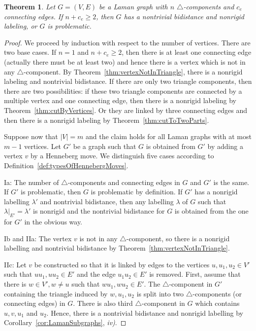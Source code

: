 \documentclass[a4paper, 11pt]{article}
\newcommand{\trcomp}{$\triangle$-component}
\newcommand{\trcomps}{$\triangle$-components}
\newtheorem{thm}{Theorem}[section]
\theoremstyle{definition}
\begin{document}
\begin{thm}
Let $G=(V,E)$ be a Laman graph with $n$ \trcomps{} and $c_e$ connecting edges. If $n+c_e\geq 2$, then $G$ has a nontrivial bidistance and nonrigid labeling, or $G$ is problematic.
\end{thm}
\begin{proof}
We proceed by induction with respect to the number of vertices. There are two base cases. If $n=1$ and $n+c_e\geq 2$, then there is at least one connecting edge (actually there must be at least two) and hence there is a vertex which is not in any \trcomp{}. By Theorem~\ref{thm:vertexNotInTriangle}, there is a nonrigid labeling and nontrivial bidistance.
If there are only two triangle components, then there are two possibilities: if these two triangle components are connected by a multiple vertex and one connecting edge, then there is a nonrigid labeling by Theorem~\ref{thm:cutByVertices}. Or they are linked by three connecting edges and then there is a nonrigid labeling by Theorem~\ref{thm:cutToTwoParts}.

Suppose now that $|V|=m$ and the claim holds for all Laman graphs with at most $m-1$ vertices. Let $G'$ be a graph such that $G$ is obtained from $G'$ by adding a vertex $v$ by a Henneberg move. We distinguish five cases according to Definition~\ref{def:typesOfHennebergMoves}.

Ia: The number of \trcomps{} and connecting edges in $G$ and $G'$ is the same. If $G'$ is problematic, then $G$ is problematic by definition. If $G'$ has a nonrigid labelling $\lambda'$ and nontrivial bidistance, then any labelling $\lambda$ of $G$ such that $\lambda|_{E'}=\lambda'$ is nonrigid and the nontrivial bidistance for $G$ is obtained from the one for $G'$ in the obvious way.

Ib and IIa: The vertex $v$ is not in any \trcomp{}, so there is a nonrigid labelling and nontrivial bidistance by Theorem~\ref{thm:vertexNotInTriangle}.

IIc: Let $v$ be constructed so that it is linked by edges to the vertices $u,u_1,u_2 \in V'$ such that $uu_1,uu_2\in E'$ and the edge $u_1u_2\in E'$ is removed. First, assume that there is $w\in V', w\neq u$ such that $wu_1,wu_2\in E'$. The \trcomp{} in $G'$ containing the triangle induced by $w, u_1, u_2$ is split into two \trcomps{} (or connecting edges) in $G$. There is also third \trcomp{} in $G$ which contains $u,v,u_1$ and $u_2$. Hence, there is a nontrivial bidistance and nonrigid labelling by Corollary~\ref{cor:LamanSubgraphs}, \textit{iv)}.


\end{proof}
\end{document}
